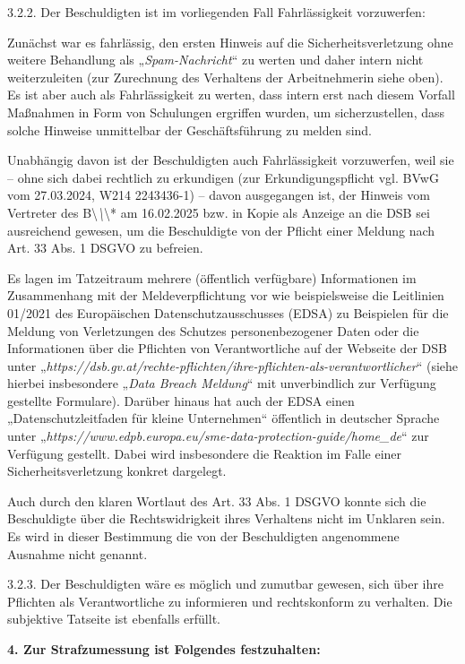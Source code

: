 \documentclass[11pt,a4paper]{article}
\begin{document}
3.2.2. Der Beschuldigten ist im vorliegenden Fall Fahrlässigkeit vorzuwerfen:

Zunächst war es fahrlässig, den ersten Hinweis auf die Sicherheitsverletzung ohne weitere Behandlung als „\textit{Spam-Nachricht}“ zu werten und daher intern nicht weiterzuleiten (zur Zurechnung des Verhaltens der Arbeitnehmerin siehe oben). Es ist aber auch als Fahrlässigkeit zu werten, dass intern erst nach diesem Vorfall Maßnahmen in Form von Schulungen ergriffen wurden, um sicherzustellen, dass solche Hinweise unmittelbar der Geschäftsführung zu melden sind.

Unabhängig davon ist der Beschuldigten auch Fahrlässigkeit vorzuwerfen, weil sie – ohne sich dabei rechtlich zu erkundigen (zur Erkundigungspflicht vgl. BVwG vom 27.03.2024, W214 2243436-1) – davon ausgegangen ist, der Hinweis vom Vertreter des B\textbackslash{}\textit{\textbackslash{}}\textbackslash{}* am 16.02.2025 bzw. in Kopie als Anzeige an die DSB sei ausreichend gewesen, um die Beschuldigte von der Pflicht einer Meldung nach Art. 33 Abs. 1 DSGVO zu befreien.

Es lagen im Tatzeitraum mehrere (öffentlich verfügbare) Informationen im Zusammenhang mit der Meldeverpflichtung vor wie beispielsweise die Leitlinien 01/2021 des Europäischen Datenschutzausschusses (EDSA) zu Beispielen für die Meldung von Verletzungen des Schutzes personenbezogener Daten oder die Informationen über die Pflichten von Verantwortliche auf der Webseite der DSB unter „\textit{https://dsb.gv.at/rechte-pflichten/ihre-pflichten-als-verantwortlicher}“ (siehe hierbei insbesondere „\textit{Data Breach Meldung}“ mit unverbindlich zur Verfügung gestellte Formulare). Darüber hinaus hat auch der EDSA einen „Datenschutzleitfaden für kleine Unternehmen“ öffentlich in deutscher Sprache unter „\textit{https://www.edpb.europa.eu/sme-data-protection-guide/home\_de}“ zur Verfügung gestellt. Dabei wird insbesondere die Reaktion im Falle einer Sicherheitsverletzung konkret dargelegt.

Auch durch den klaren Wortlaut des Art. 33 Abs. 1 DSGVO konnte sich die Beschuldigte über die Rechtswidrigkeit ihres Verhaltens nicht im Unklaren sein. Es wird in dieser Bestimmung die von der Beschuldigten angenommene Ausnahme nicht genannt.

3.2.3. Der Beschuldigten wäre es möglich und zumutbar gewesen, sich über ihre Pflichten als Verantwortliche zu informieren und rechtskonform zu verhalten. Die subjektive Tatseite ist ebenfalls erfüllt.

\textbf{4. Zur Strafzumessung ist Folgendes festzuhalten:}
\end{document}
